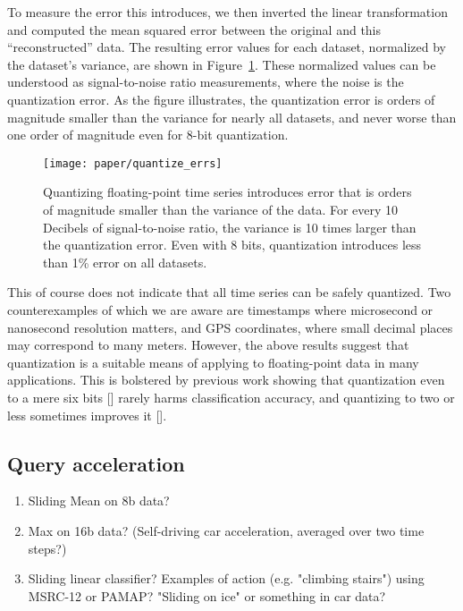 To measure the error this introduces, we then inverted the linear transformation and computed the mean squared error between the original and this ``reconstructed'' data. The resulting error values for each dataset, normalized by the dataset's variance, are shown in Figure~\ref{fig:quantize_errs}. These normalized values can be understood as signal-to-noise ratio measurements, where the noise is the quantization error. As the figure illustrates, the quantization error is orders of magnitude smaller than the variance for nearly all datasets, and never worse than one order of magnitude even for 8-bit quantization.

\begin{figure}[h]
\begin{center}
    \texttt{[image: paper/quantize\_errs]}
    \caption{Quantizing floating-point time series introduces error that is orders of magnitude smaller than the variance of the data. For every 10 Decibels of signal-to-noise ratio, the variance is 10 times larger than the quantization error. Even with 8 bits, quantization introduces less than 1\% error on all datasets.}
    \label{fig:quantize_errs}
\end{center}
\end{figure}

This of course does not indicate that all time series can be safely quantized. Two counterexamples of which we are aware are timestamps where microsecond or nanosecond resolution matters, and GPS coordinates, where small decimal places may correspond to many meters. However, the above results suggest that quantization is a suitable means of applying \minesp to floating-point data in many applications. This is bolstered by previous work showing that quantization even to a mere six bits [] rarely harms classification accuracy, and quantizing to two or less sometimes improves it [].

\subsection{Query acceleration}

\begin{enumerate}
\item Sliding Mean on 8b data?
\item Max on 16b data? (Self-driving car acceleration, averaged over two time steps?)
\item Sliding linear classifier? Examples of action (e.g. "climbing stairs") using MSRC-12 or PAMAP? "Sliding on ice" or something in car data?
\end{enumerate}

